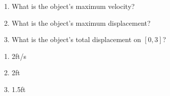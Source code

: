 {\noindent
\begin{minipage}{\linewidth}
\end{minipage}
\begin{enumerate}
\item		What is the object's maximum velocity?
\item		What is the object's maximum displacement?
\item		What is the object's total displacement on $[0,3]$?
\end{enumerate}

}
{\begin{enumerate}
\item		2ft/s
\item		2ft
\item		1.5ft
\end{enumerate}
}

